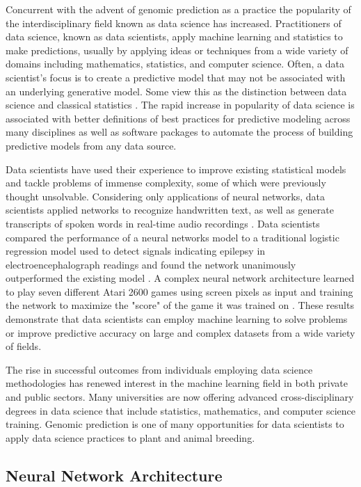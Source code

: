 Concurrent with the advent of genomic prediction as a practice the popularity of the 
interdisciplinary field known as data science has increased. Practitioners of data 
science, known as data scientists, apply machine learning and statistics to make 
predictions, usually by applying ideas or techniques from a wide variety of domains 
including mathematics, statistics, and computer science. Often, a data scientist's focus is to
create a predictive model that may not be associated with an underlying generative model. 
Some view this as the distinction between data science and classical statistics 
\citep{donoho2015, breiman2001}. The rapid increase in popularity of data science
is associated with better definitions of best practices for predictive modeling
across many disciplines as well as software packages to automate the 
process of building predictive models from any data source.

Data scientists have used their experience to improve existing statistical 
models and tackle problems of immense complexity, some of which were previously 
thought unsolvable. Considering only applications of neural networks, data scientists
applied networks to recognize handwritten text, as well as generate transcripts of spoken 
words in real-time audio recordings \citep{lang1990}.
Data scientists compared the performance of a neural networks model to a traditional 
logistic regression model used to detect signals indicating epilepsy in electroencephalograph 
readings and found the network unanimously outperformed the existing model \citep{subasi2005}.
A complex neural network architecture learned to play seven different Atari 2600 
games using screen pixels as input and training the network to maximize the "score" of
the game it was trained on \citep{mnih2013}. These results demonstrate that data scientists
can employ machine learning to solve problems or improve predictive accuracy on large and 
complex datasets from a wide variety of fields.

The rise in successful outcomes from individuals employing data science
methodologies has renewed interest in the machine learning field in both
private and public sectors. Many universities are now offering advanced cross-disciplinary
degrees in data science that include statistics, mathematics, and computer
science training. Genomic prediction is one of many opportunities for data scientists
to apply data science practices to plant and animal breeding.

\subsection*{Neural Network Architecture} \label{ssec:neuralnets}

